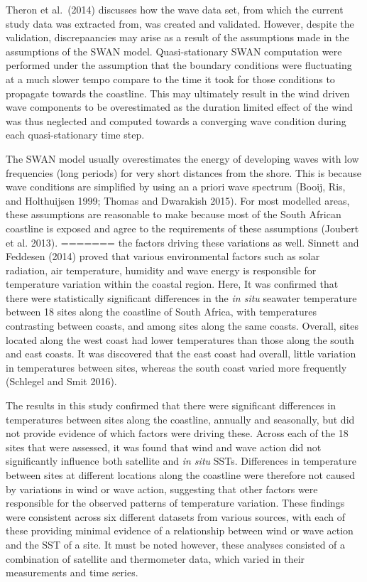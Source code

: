 \documentclass[12pt,A4paper,]{article}
\begin{document}
Theron et al.~(2014) discusses how the wave data set, from which the
current study data was extracted from, was created and validated.
However, despite the validation, discrepaancies may arise as a result of
the assumptions made in the assumptions of the SWAN model.
Quasi-stationary SWAN computation were performed under the assumption
that the boundary conditions were fluctuating at a much slower tempo
compare to the time it took for those conditions to propagate towards
the coastline. This may ultimately result in the wind driven wave
components to be overestimated as the duration limited effect of the
wind was thus neglected and computed towards a converging wave condition
during each quasi-stationary time step.

The SWAN model usually overestimates the energy of developing waves with
low frequencies (long periods) for very short distances from the shore.
This is because wave conditions are simplified by using an a priori wave
spectrum (Booij, Ris, and Holthuijsen 1999; Thomas and Dwarakish 2015).
For most modelled areas, these assumptions are reasonable to make
because most of the South African coastline is exposed and agree to the
requirements of these assumptions (Joubert et al. 2013).
=======
the factors driving these variations as well. Sinnett and Feddesen
(2014) proved that various environmental factors such as solar
radiation, air temperature, humidity and wave energy is responsible for
temperature variation within the coastal region. Here, It was confirmed
that there were statistically significant differences in the \emph{in
situ} seawater temperature between 18 sites along the coastline of South
Africa, with temperatures contrasting between coasts, and among sites
along the same coasts. Overall, sites located along the west coast had
lower temperatures than those along the south and east coasts. It was
discovered that the east coast had overall, little variation in
temperatures between sites, whereas the south coast varied more
frequently (Schlegel and Smit 2016).

The results in this study confirmed that there were significant
differences in temperatures between sites along the coastline, annually
and seasonally, but did not provide evidence of which factors were
driving these. Across each of the 18 sites that were assessed, it was
found that wind and wave action did not significantly influence both
satellite and \emph{in situ} SSTs. Differences in temperature between
sites at different locations along the coastline were therefore not
caused by variations in wind or wave action, suggesting that other
factors were responsible for the observed patterns of temperature
variation. These findings were consistent across six different datasets
from various sources, with each of these providing minimal evidence of a
relationship between wind or wave action and the SST of a site. It must
be noted however, these analyses consisted of a combination of satellite
and thermometer data, which varied in their measurements and time
series.
\end{document}
